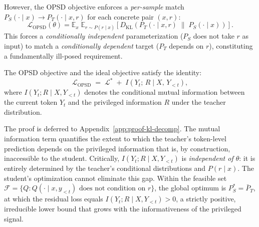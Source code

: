 \documentclass[]{jingdong}
\begin{document}
However, the OPSD objective enforces a \textit{per-sample} match $P_S(\cdot \mid x) \to P_T(\cdot \mid x, r)$ for each concrete pair $(x, r)$:
\begin{equation}
    \mathcal{L}_{\text{OPSD}}(\theta) = \mathbb{E}_{x}\;\mathbb{E}_{r \sim P(r \mid x)}\!\left[D_{\mathrm{KL}}\!\left(P_T(\cdot \mid x, r) \;\|\; P_S(\cdot \mid x)\right)\right].
    \label{eq:opsd-obj}
\end{equation}
This forces a \textit{conditionally independent} parameterization ($P_S$ does not take $r$ as input) to match a \textit{conditionally dependent} target ($P_T$ depends on $r$), constituting a fundamentally ill-posed requirement.

\begin{theorem}[KL Decomposition]
\label{thm:kl-decomp}
The OPSD objective and the ideal objective satisfy the identity:
\begin{equation}
    \mathcal{L}_{\mathrm{OPSD}} \;=\; \mathcal{L}^* \;+\; I(Y_t;\, R \mid X,\, Y_{<t}),
    \label{eq:kl-decomp}
\end{equation}
where $I(Y_t; R \mid X, Y_{<t})$ denotes the conditional mutual information between the current token $Y_t$ and the privileged information $R$ under the teacher distribution.
\end{theorem}

The proof is deferred to Appendix~\ref{app:proof-kl-decomp}. The mutual information term quantifies the extent to which the teacher's token-level prediction depends on the privileged information that is, by construction, inaccessible to the student. Critically, $I(Y_t; R \mid X, Y_{<t})$ is \textit{independent of $\theta$}: it is entirely determined by the teacher's conditional distributions and $P(r \mid x)$. The student's optimization cannot eliminate this gap. Within the feasible set $\mathcal{F} = \{Q : Q(\cdot \mid x, y_{<t}) \text{ does not condition on } r\}$, the global optimum is $P_S^* = \bar{P}_T$, at which the residual loss equals $I(Y_t; R \mid X, Y_{<t}) > 0$, a strictly positive, irreducible lower bound that grows with the informativeness of the privileged signal.
\end{document}
